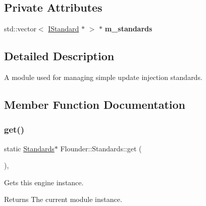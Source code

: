 \subsection*{Private Attributes}
\begin{DoxyCompactItemize}
\item 
\mbox{\label{class_flounder_1_1_standards_a473e75cc830937dfc49c3dbfa5c78b05}} 
std\+::vector$<$ \hyperlink{class_flounder_1_1_i_standard}{I\+Standard} $\ast$ $>$ $\ast$ {\bfseries m\+\_\+standards}
\end{DoxyCompactItemize}


\subsection{Detailed Description}
A module used for managing simple update injection standards. 



\subsection{Member Function Documentation}
\mbox{\label{class_flounder_1_1_standards_af9b0dddb6bff751d794ae5d6dde9687d}} 
\subsubsection{\texorpdfstring{get()}{get()}}
{\footnotesize\ttfamily static \hyperlink{class_flounder_1_1_standards}{Standards}$\ast$ Flounder\+::\+Standards\+::get (\begin{DoxyParamCaption}{ }\end{DoxyParamCaption})\hspace{0.3cm}{\ttfamily [inline]}, {\ttfamily [static]}}



Gets this engine instance. 

\begin{DoxyReturn}{Returns}
The current module instance. 
\end{DoxyReturn}
\mbox{\label{class_flounder_1_1_standards_afe821394da2f3d4a92ff9dc2dbf75b1e}} 
